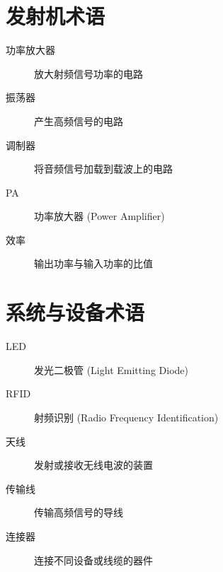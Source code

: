 \section{发射机术语}

\begin{description}
    \item[功率放大器] 放大射频信号功率的电路
    \item[振荡器] 产生高频信号的电路
    \item[调制器] 将音频信号加载到载波上的电路
    \item[PA] 功率放大器 (Power Amplifier)
    \item[效率] 输出功率与输入功率的比值
\end{description}

\section{系统与设备术语}

\begin{description}
    \item[LED] 发光二极管 (Light Emitting Diode)
    \item[RFID] 射频识别 (Radio Frequency Identification)
    \item[天线] 发射或接收无线电波的装置
    \item[传输线] 传输高频信号的导线
    \item[连接器] 连接不同设备或线缆的器件
\end{description}